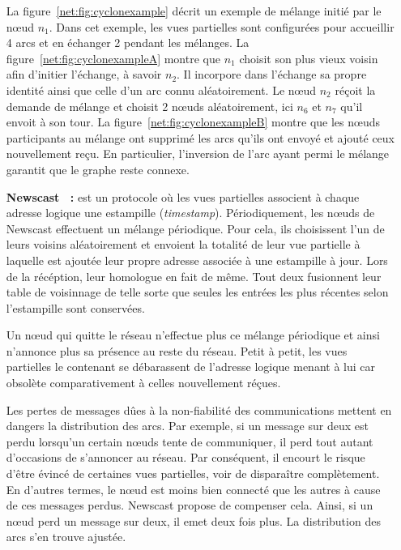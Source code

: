 \begin{itemize}
  La figure~\ref{net:fig:cyclonexample} décrit un exemple de mélange initié par
  le nœud $n_1$. Dans cet exemple, les vues partielles sont configurées pour
  accueillir 4 arcs et en échanger 2 pendant les mélanges. La
  figure~\ref{net:fig:cyclonexampleA} montre que $n_1$ choisit son plus vieux
  voisin afin d'initier l'échange, à savoir $n_2$. Il incorpore dans l'échange
  sa propre identité ainsi que celle d'un arc connu aléatoirement. Le nœud $n_2$
  réçoit la demande de mélange et choisit 2 nœuds aléatoirement, ici $n_6$ et
  $n_7$ qu'il envoit à son tour. La figure~\ref{net:fig:cyclonexampleB} montre
  que les nœuds participants au mélange ont supprimé les arcs qu'ils ont envoyé
  et ajouté ceux nouvellement reçu. En particulier, l'inversion de l'arc ayant
  permi le mélange garantit que le graphe reste connexe.

\item [\textbf{Newscast~\cite{tolgyeski2009adaptive} :}] est un protocole où les
  vues partielles associent à chaque adresse logique une estampille
  (\emph{timestamp}). Périodiquement, les nœuds de Newscast effectuent un
  mélange périodique. Pour cela, ils choisissent l'un de leurs voisins
  aléatoirement et envoient la totalité de leur vue partielle à laquelle est
  ajoutée leur propre adresse associée à une estampille à jour. Lors de la
  récéption, leur homologue en fait de même. Tout deux fusionnent leur table de
  voisinnage de telle sorte que seules les entrées les plus récentes selon
  l'estampille sont conservées.

  Un nœud qui quitte le réseau n'effectue plus ce mélange périodique et ainsi
  n'annonce plus sa présence au reste du réseau. Petit à petit, les vues
  partielles le contenant se débarassent de l'adresse logique menant à lui car
  obsolète comparativement à celles nouvellement réçues.

  Les pertes de messages dûes à la non-fiabilité des communications mettent en
  dangers la distribution des arcs. Par exemple, si un message sur deux est
  perdu lorsqu'un certain nœuds tente de communiquer, il perd tout autant
  d'occasions de s'annoncer au réseau. Par conséquent, il encourt le risque
  d'être évincé de certaines vues partielles, voir de disparaître
  complètement. En d'autres termes, le nœud est moins bien connecté que les
  autres à cause de ces messages perdus. Newscast propose de compenser
  cela. Ainsi, si un nœud perd un message sur deux, il emet deux fois plus. La
  distribution des arcs s'en trouve ajustée.


\end{itemize}
